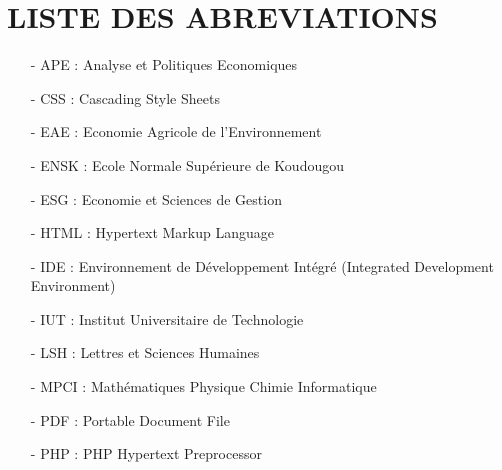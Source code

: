 \chapter*{LISTE DES ABREVIATIONS}

\thispagestyle{MyStyle}



\begin{itemize}
    \item[-]{
       APE : Analyse et Politiques Economiques
    }
   
   
    \item[-]{
        CSS : Cascading Style Sheets
    }
   
    \item[-]{
        EAE : Economie Agricole de l'Environnement
    }
   
    \item[-]{
        ENSK : Ecole Normale Supérieure de Koudougou
    }
    \item[-]{
        ESG : Economie et Sciences de Gestion
    }
   
   
    \item[-]{
        HTML : Hypertext Markup Language
    }
    \item[-]{
        IDE : Environnement de Développement Intégré (Integrated Development Environment)
    }
    \item[-]{
        IUT : Institut Universitaire de Technologie
    }
   
    \item[-]{
        LSH : Lettres et Sciences Humaines
    }
  
    
  
    \item[-]{
        MPCI : Mathématiques Physique Chimie Informatique
    }
 \item[-]{
        PDF : Portable Document File
    }    
    
    \item[-]{
        PHP : PHP Hypertext Preprocessor
    }
   

\end{itemize}
